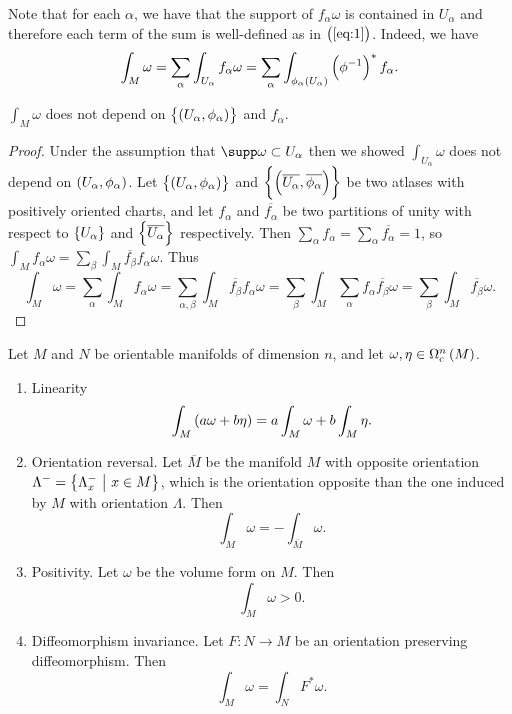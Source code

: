 \pagebreak

\begin{remark}
Note that for each $ \alpha $, we have that the support of $ f_\alpha\omega $ is contained in $ U_\alpha $ and therefore each term of the sum is well-defined as in $ \br{\ref{eq:1}} $. Indeed, we have
$$ \int_M \omega = \sum_\alpha \int_{U_\alpha} f_\alpha\omega = \sum_\alpha \int_{\phi_\alpha\br{U_\alpha}} \br{\phi^{-1}}^*f_\alpha. $$
\end{remark}

\begin{lemma}
$ \int_M \omega $ does not depend on $ \cbr{\br{U_\alpha, \phi_\alpha}} $ and $ f_\alpha $.
\end{lemma}

\begin{proof}
Under the assumption that $ \supp \omega \subset U_\alpha $ then we showed $ \int_{U_\alpha} \omega $ does not depend on $ \br{U_\alpha, \phi_\alpha} $. Let $ \cbr{\br{U_\alpha, \phi_\alpha}} $ and $ \cbr{\br{\overline{U_\alpha}, \overline{\phi_\alpha}}} $ be two atlases with positively oriented charts, and let $ f_\alpha $ and $ \overline{f_\alpha} $ be two partitions of unity with respect to $ \cbr{U_\alpha} $ and $ \cbr{\overline{U_\alpha}} $ respectively. Then $ \sum_\alpha f_\alpha = \sum_\alpha \overline{f_\alpha} = 1 $, so $ \int_M f_\alpha\omega = \sum_\beta \int_M \overline{f_\beta}f_\alpha\omega $. Thus
$$ \int_M \omega = \sum_\alpha \int_M f_\alpha\omega = \sum_{\alpha, \beta} \int_M \overline{f_\beta}f_\alpha\omega = \sum_\beta \int_M \sum_\alpha f_\alpha\overline{f_\beta}\omega = \sum_\beta \int_M \overline{f_\beta}\omega. $$
\end{proof}

\begin{proposition}
Let $ M $ and $ N $ be orientable manifolds of dimension $ n $, and let $ \omega, \eta \in \Omega_\c^n\br{M} $.
\begin{enumerate}
\item Linearity
$$ \int_M \br{a\omega + b\eta} = a\int_M \omega + b\int_M \eta. $$
\item Orientation reversal. Let $ \overline{M} $ be the manifold $ M $ with opposite orientation $ \Lambda^- = \cbr{\Lambda_x^- \st x \in M} $, which is the orientation opposite than the one induced by $ M $ with orientation $ \Lambda $. Then
$$ \int_M \omega = -\int_{\overline{M}} \omega. $$
\item Positivity. Let $ \omega $ be the volume form on $ M $. Then
$$ \int_M \omega > 0. $$
\item Diffeomorphism invariance. Let $ F : N \to M $ be an orientation preserving diffeomorphism. Then
$$ \int_M \omega = \int_N F^*\omega. $$
\end{enumerate}
\end{proposition}


